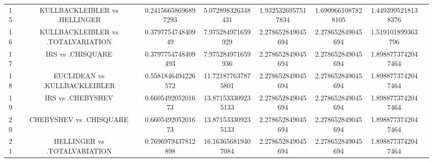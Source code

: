 \documentclass[a4paper,10pt]{article}
\begin{document}
\begin{landscape}
\begin{table}[!htp]
\begin{tabular}{cccccccc}
15&KULLBACKLEIBLER vs .HELLINGER&0.24156658696897293&5.072898326348431&1.9325326957517834&1.6909661087828105&1.4493995218138376\\
16&KULLBACKLEIBLER vs .TOTALVARIATION&0.379775474840949&7.975284971659929&2.278652849045694&2.278652849045694&1.519101899363796\\
17&IRS vs .CHISQUARE&0.3797754748409493&7.975284971659936&2.278652849045694&2.278652849045694&1.8988773742047464\\
18&EUCLIDEAN vs .KULLBACKLEIBLER&0.5581846494226572&11.721877637875801&2.278652849045694&2.278652849045694&1.8988773742047464\\
19&IRS vs .CHEBYSHEV&0.660549205201673&13.871533309235133&2.278652849045694&2.278652849045694&1.8988773742047464\\
20&CHEBYSHEV vs .CHISQUARE&0.660549205201673&13.871533309235133&2.278652849045694&2.278652849045694&1.8988773742047464\\
21&HELLINGER vs .TOTALVARIATION&0.7696979437812898&16.163656819407084&2.278652849045694&2.278652849045694&1.8988773742047464\\
\hline
\end{tabular}
\end{table}

\end{landscape}
\end{document}
